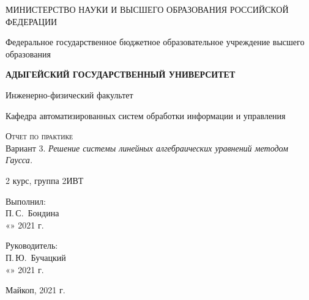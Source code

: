 \documentclass[12pt,a4paper]{scrartcl}
\begin{document}
	\begin{titlepage}
		\begin{center}
			\large
			МИНИСТЕРСТВО НАУКИ И ВЫСШЕГО ОБРАЗОВАНИЯ РОССИЙСКОЙ ФЕДЕРАЦИИ
			
			Федеральное государственное бюджетное образовательное учреждение высшего образования
			
			\textbf{АДЫГЕЙСКИЙ ГОСУДАРСТВЕННЫЙ УНИВЕРСИТЕТ}
			\vspace{0.25cm}
			
			Инженерно-физический факультет
			
			Кафедра автоматизированных систем обработки информации и управления
			\vfill

			\vfill
			
			\textsc{Отчет по практике}\\[5mm]
			
			{\LARGE Вариант 3. \textit{Решение системы линейных алгебраических уравнений методом Гаусса.}}
			\bigskip
			
			2 курс, группа 2ИВТ
		\end{center}
		\vfill
		
		\newlength{\ML}
		\hfill\begin{minipage}{0.5\textwidth}
			Выполнил:\\
			\underline{\hspace{\ML}} П.\,С.~Бондина\\
			«\underline{\hspace{0.7cm}}» \underline{\hspace{2cm}} 2021 г.
		\end{minipage}%
		\bigskip
		
		\hfill\begin{minipage}{0.5\textwidth}
			Руководитель:\\
			\underline{\hspace{\ML}} П.\,Ю.~Бучацкий \\
			«\underline{\hspace{0.7cm}}» \underline{\hspace{2cm}} 2021 г.
		\end{minipage}%
		\vfill
		
		\begin{center}
			Майкоп, 2021 г.
		\end{center}
	\end{titlepage}
\end{document}
